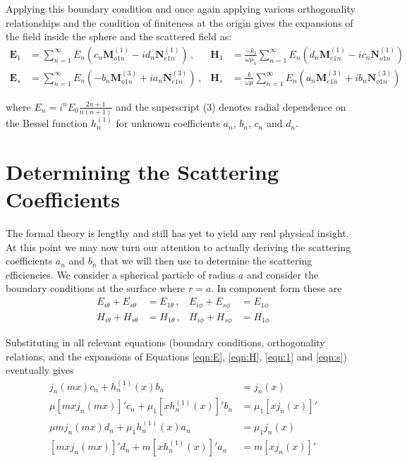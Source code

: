 {\noindent Applying this boundary condition and once again applying various orthogonality relationships and the condition of finiteness at the origin gives the expansions of the field inside the sphere and the scattered field as:
\begin{align}
\label{eqn:1}
\mathbf{E}_1 &= \sum _{n=1} ^{\infty} E_n (c_n\mathbf{M}_{o1n}^{(1)} - id_n\mathbf{N}_{e1n}^{(1)}) \, , &\mathbf{H}_1 &= \frac{-k_1}{\omega\mu_1} \sum _{n=1} ^{\infty}E_n(d_n\mathbf{M}_{e1n}^{(1)} - ic_n\mathbf{N}_{o1n}^{(1)}) \\
\label{eqn:s}
\mathbf{E}_s &= \sum _{n=1} ^{\infty} E_n (-b_n\mathbf{M}_{o1n}^{(3)} + ia_n\mathbf{N}_{e1n}^{(3)}) \,
 , &\mathbf{H}_s &= \frac{k}{\omega\mu} \sum _{n=1} ^{\infty}E_n(a_n\mathbf{M}_{e1n}^{(3)} + ib_n\mathbf{N}_{o1n}^{(3)}) 
\end{align}

\noindent where $E_n=i^n E_0  \frac{2n+1}{n(n+1)}$ and the superscript (3) denotes radial dependence on the Bessel function $h_n^{(1)}$ for unknown coefficients $a_n$, $b_n$, $c_n$ and $d_n$.

\section{Determining the Scattering Coefficients}

The formal theory is lengthy and still has yet to yield any real physical insight.  At this point we may now turn our attention to actually deriving the scattering coefficients $a_n$ and $b_n$ that we will then use to determine the scattering efficiencies.   We consider a spherical particle of radius $a$ and consider the boundary conditions at the surface where $r=a$.  In component form these are 
\begin{align}
E_{i\theta}+E_{s\theta}&=E_{1\theta}\, , & E_{i\phi}+E_{s\phi}&=E_{1\phi} \\
H_{i\theta}+H_{s\theta}&=H_{1\theta} \, , &H_{i\phi}+H_{s\phi}&=H_{1\phi} 
\end{align}

\noindent Substituting in all relevant equations (boundary conditions, orthogonality relations, and the expansions of Equations \ref{eqn:E}, \ref{eqn:H}, \ref{eqn:1} and \ref{eqn:s}) eventually gives
\begin{align}
j_n(mx)c_n+h^{(1)}_n(x)b_n&=j_n(x) \\
\mu[mxj_n(mx)]'c_n+\mu_1[xh_n^{(1)}(x)]'b_n&=\mu_1[xj_n(x)]' \\
\mu mj_n(mx)d_n+\mu_1h^{(1)}_n(x)a_n&=\mu_1j_n(x) \\
[mxj_n(mx)]'d_n+m[xh_n^{(1)}(x)]'a_n&=m[xj_n(x)]'
\end{align}

}
